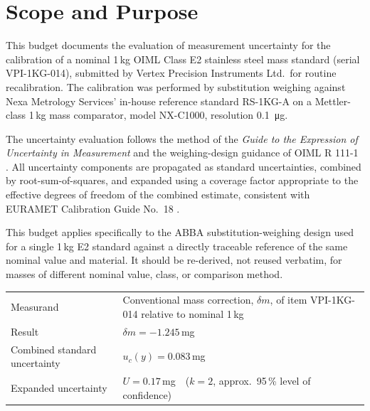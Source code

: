 \section{Scope and Purpose}

This budget documents the evaluation of measurement uncertainty for the calibration
of a nominal 1\,kg OIML Class E2 stainless steel mass standard (serial
VPI-1KG-014), submitted by Vertex Precision Instruments Ltd.\ for routine
recalibration. The calibration was performed by substitution weighing against
Nexa Metrology Services' in-house reference standard RS-1KG-A on a Mettler-class
1\,kg mass comparator, model NX-C1000, resolution \SI{0.1}{\micro\gram}.

The uncertainty evaluation follows the method of the \emph{Guide to the
Expression of Uncertainty in Measurement} \cite{jcgm100} and the weighing-design
guidance of OIML R 111-1 \cite{oimlr111}. All uncertainty components are
propagated as standard uncertainties, combined by root-sum-of-squares, and
expanded using a coverage factor appropriate to the effective degrees of
freedom of the combined estimate, consistent with EURAMET Calibration Guide
No.\ 18 \cite{euramet_cg18}.

\begin{notebox}[Applicability]
This budget applies specifically to the ABBA substitution-weighing design used
for a single 1\,kg E2 standard against a directly traceable reference of the
same nominal value and material. It should be re-derived, not reused verbatim,
for masses of different nominal value, class, or comparison method.
\end{notebox}

\begin{keybox}[At a glance]
\begin{tabularx}{\linewidth}{@{}X X@{}}
Measurand & Conventional mass correction, $\delta m$, of item VPI-1KG-014 relative to nominal 1\,kg \\
Result & $\delta m = -1.245$\,mg \\
Combined standard uncertainty & $u_c(y) = 0.083$\,mg \\
Expanded uncertainty & $U = 0.17$\,mg\ \ ($k = 2$, approx.\ 95\,\% level of confidence) \\
\end{tabularx}
\end{keybox}
